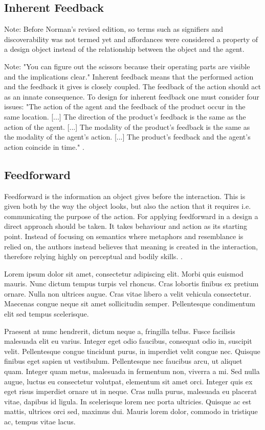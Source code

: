 \subsection{Inherent Feedback}
Note: Before Norman's revised edition, so terms such as signifiers and discoverability was not termed yet and affordances were considered a property of a design object instead of the relationship between the object and the agent.


Note: "You can figure out the scissors because their operating parts are
visible and the implications clear." \cite{norman}
Inherent feedback means that the performed action and the feedback it gives is closely coupled. The feedback of the action should act as an innate consequence. To design for inherent feedback one must consider four issues: "The action of the agent and the feedback of the product occur in the
same location. [...] The direction of the product's feedback is the same as the action of
the agent. [...] The modality of the product's feedback is the same as the modality
of the agent's action. [...] The product's feedback and the agent's action coincide in time." \cite{howdonald}.

\cite{frogger}
\subsection{Feedforward}
Feedforward is the information an object gives before the interaction. This is given both by the way the object looks, but also the action that it requires i.e. communicating the purpose of the action. For applying feedforward in a design a direct approach should be taken. It takes behaviour and action as its starting point. Instead of focusing on semantics where metaphors and resemblance is relied on, the authors instead believes that meaning is created in the interaction, therefore relying highly on perceptual and bodily skills. \cite{howdonald}.



\newpage



Lorem ipsum dolor sit amet, consectetur adipiscing elit. Morbi quis euismod mauris. Nunc dictum tempus turpis vel rhoncus. Cras lobortis finibus ex pretium ornare. Nulla non ultrices augue. Cras vitae libero a velit vehicula consectetur. Maecenas congue neque sit amet sollicitudin semper. Pellentesque condimentum elit sed tempus scelerisque.

Praesent at nunc hendrerit, dictum neque a, fringilla tellus. Fusce facilisis malesuada elit eu varius. Integer eget odio faucibus, consequat odio in, suscipit velit. Pellentesque congue tincidunt purus, in imperdiet velit congue nec. Quisque finibus eget sapien ut vestibulum. Pellentesque nec faucibus arcu, ut aliquet quam. Integer quam metus, malesuada in fermentum non, viverra a mi. Sed nulla augue, luctus eu consectetur volutpat, elementum sit amet orci. Integer quis ex eget risus imperdiet ornare ut in neque. Cras nulla purus, malesuada eu placerat vitae, dapibus id ligula. In scelerisque lorem nec porta ultricies. Quisque ac est mattis, ultrices orci sed, maximus dui. Mauris lorem dolor, commodo in tristique ac, tempus vitae lacus.

